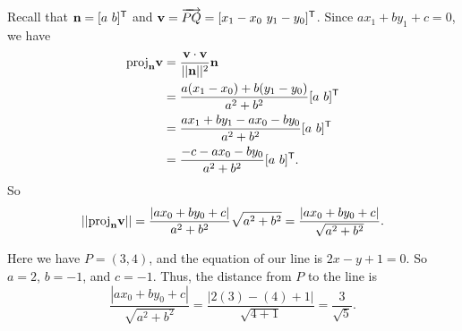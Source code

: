 \begin{example}
\item Recall that $\mathbf{n} = [a \ b]^{\mathsf{T}}$ and $\vv = \overrightarrow{PQ} = [x_1-x_0 \ y_1-y_0]^{\tr}$. Since $ax_1+by_1+c = 0$, we have 
\begin{align*}
\text{proj}_{\mathbf{n}} \mathbf{v} &= \frac{\mathbf{v} \cdot \mathbf{v}}{||\mathbf{n}||^2} \mathbf{n} \\
	&= \frac{a(x_1-x_0)+ b(y_1-y_0)}{a^2+b^2} [a \ b]^{\mathsf{T}} \\
	&= \frac{ax_1+by_1-ax_0-by_0}{a^2+b^2} [a \ b]^{\mathsf{T}} \\
	&= \frac{-c-ax_0-by_0}{a^2+b^2} [a \ b]^{\mathsf{T}}.
\end{align*}
So 
\[||\text{proj}_{\mathbf{n}} \mathbf{v}|| = \frac{|ax_0+by_0+c|}{a^2+b^2} \sqrt{a^2+b^2} = \frac{|ax_0+by_0+c|}{\sqrt{a^2+b^2}}.\]

\item Here we have $P = (3,4)$, and the equation of our line is $2x-y+1=0$. So $a=2$, $b=-1$, and $c=-1$. Thus, the distance from $P$ to the line is 
\[\frac{|ax_0+by_0+c|}{\sqrt{a^2+b^2}} = \frac{|2(3)-(4)+1|}{\sqrt{4+1}} = \frac{3}{\sqrt{5}}.\]

\ea

\end{example}

